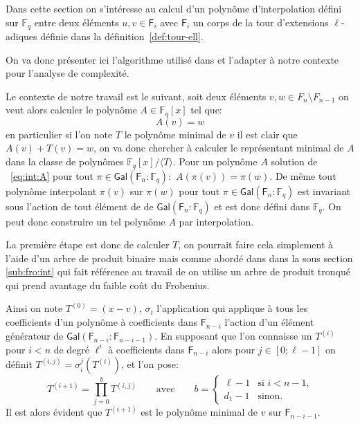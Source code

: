 \documentclass[10pt,a4paper]{book}
\theoremstyle{plain}
\theoremstyle{definition}
\theoremstyle{definition}
\theoremstyle{definition}
\theoremstyle{definition}
\theoremstyle{definition}
\theoremstyle{remark}
\theoremstyle{remark}
\theoremstyle{definition}
\begin{document}
Dans cette section on s'intéresse au calcul d'un polynôme d'interpolation défini
 sur $\mathbb{F}_q$ entre deux éléments $u,v \in \mathsf{F}_i$ avec 
 $\mathsf{F}_i$ un corps de la tour d'extensions $\ell$-adiques 
  définie dans la définition~\ref{def:tour-ell}.  
  
  
 On va donc présenter ici l'algorithme utilisé dans \cite[8.7]{DeFeo10} et
 l'adapter à notre contexte pour l'analyse de complexité. 


Le contexte de notre travail est le suivant, soit deux éléments $v,w \in F_n
\setminus F_{n-1}$ on veut alors calculer le polynôme $A \in \mathbb{F}_q[x]$ 
tel que:
\begin{equation}
\label{eq:int:A}
A(v)=w
\end{equation}
en particulier si l'on note $T$ le polynôme minimal de $v$ il est clair que 
 $A(v)+T(v)=w$, on va donc chercher à calculer le représentant minimal de 
$A$ dans la classe de polynômes $\mathbb{F}_q[x]/ \langle T \rangle$.
Pour un polynôme $A$ solution de ~\ref{eq:int:A} pour tout 
$\pi \in \mathsf{Gal}(\mathsf{F}_n : \mathbb{F}_q):$ $A(\pi(v))=\pi(w)$. De même
tout polynôme interpolant $\pi(v)$ sur $\pi(w)$ pour tout 
$\pi \in \mathsf{Gal}(\mathsf{F}_n : \mathbb{F}_q)$ est invariant sous l'action
de tout élément de de $\mathsf{Gal}(\mathsf{F}_n : \mathbb{F}_q)$ et est donc 
défini dans $\mathbb{F}_q$. On peut donc construire un tel polynôme $A$ par 
interpolation. 

La première étape est donc de calculer $T$, on pourrait faire  cela simplement 
à l'aide d'un arbre de produit binaire mais comme abordé dans dans la sous 
section \ref{sub:fro:int} qui fait référence au travail de \cite[8.7]{DeFeo10}
on utilise un arbre de produit tronqué qui prend avantage du faible coût du 
Frobenius.

Ainsi on note $T^{(0)}=(x-v)$, $\sigma_i$ l'application qui applique à tous les
 coefficients d'un polynôme à coefficients dans $\mathsf{F}_{n-i}$ l'action 
 d'un élément générateur de $\mathsf{Gal}(\mathsf{F}_{n-i} : \mathsf{F}_{n-i-1})$. En 
 supposant que l'on connaisse un $T^{(i)}$ pour $i < n$ de degré $\ell^i$ à 
 coefficients dans $\mathsf{F}_{n-i}$ alors pour $j \in [0 ; \ell-1]$ on définit
 $T^{(i,j)}=\sigma_i^j(T^{(i)})$, et l'on pose:  
\begin{equation*}
T^{(i+1)}=\prod_{j=0}^bT^{(i,j)} \qquad\text{avec}\qquad
  b = \begin{cases}
    \ell-1 &\text{si $i<n-1$,}\\
    d_1-1 &\text{sinon.}
  \end{cases}
\end{equation*}
Il est alors évident que $T^{(i+1)}$ est le polynôme minimal de $v$ sur 
$\mathsf{F}_{n-i-1}$.
\end{document}
